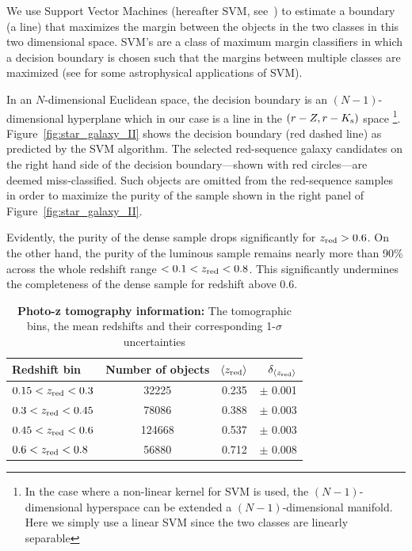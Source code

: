 \documentclass[fleqn,usenatbib,useAMS]{mnras}
\begin{document}
We use Support Vector Machines (hereafter SVM, see~\citealt{cristianini2000, scholkopf2000}) to estimate a boundary (a line) that maximizes the margin between the objects in the two classes in this two dimensional space. SVM's are a class of maximum margin  classifiers in which a decision boundary is chosen such that the margins between multiple classes are maximized (see \citealt{fadely2012, van2018} for some astrophysical applications of SVM).

In an $N$-dimensional Euclidean space, the decision boundary is an $(N-1)$-dimensional hyperplane which in our case is a line in the $(r-Z, r-K_{\rm s})$ space \footnote{In the case where a non-linear kernel for SVM is used, the $(N-1)$-dimensional hyperspace can be extended a $(N-1)$-dimensional manifold. Here we simply use a linear SVM since the two classes are linearly separable}. Figure~\ref{fig:star_galaxy_II} shows the decision boundary (red dashed line) as predicted by the SVM algorithm. The selected red-sequence galaxy candidates on the right hand side of the decision boundary---shown with red circles---are deemed miss-classified. Such objects are omitted from the red-sequence samples in order to maximize the purity of the sample shown in the right panel of Figure~\ref{fig:star_galaxy_II}. 

Evidently, the purity of the dense sample drops significantly for $z_{\rm red}>0.6$. On the other hand, the purity of the luminous sample remains nearly more than 90\% across the whole redshift range $<0.1<z_{\rm red}<0.8$. This significantly undermines the completeness of the dense sample for redshift above 0.6. 

\begin{table}
	\centering
	\caption{{\bf Photo-z tomography information:} 
    The tomographic bins, the mean redshifts and their corresponding 1-$\sigma$ uncertainties}
	\label{tab:pz}
	\begin{tabularx}{\columnwidth}{lccr} %
		\hline
		Redshift bin &  Number of objects & $\langle z_{\rm red} \rangle$ & $\delta_{\langle z_{\rm red} \rangle}$ \\
		\hline
		$0.15 <z_{\rm red}<0.3$  & 32225  &  0.235 & $\pm$ 0.001  \\
		$0.3  <z_{\rm red}<0.45$ & 78086  &  0.388 & $\pm$ 0.003  \\
        $0.45 <z_{\rm red}<0.6$  & 124668  &  0.537 & $\pm$ 0.003  \\
        $0.6  <z_{\rm red}<0.8$  & 56880  &  0.712 & $\pm$ 0.008  \\
		\hline
	\end{tabularx}
\end{table}
\end{document}

